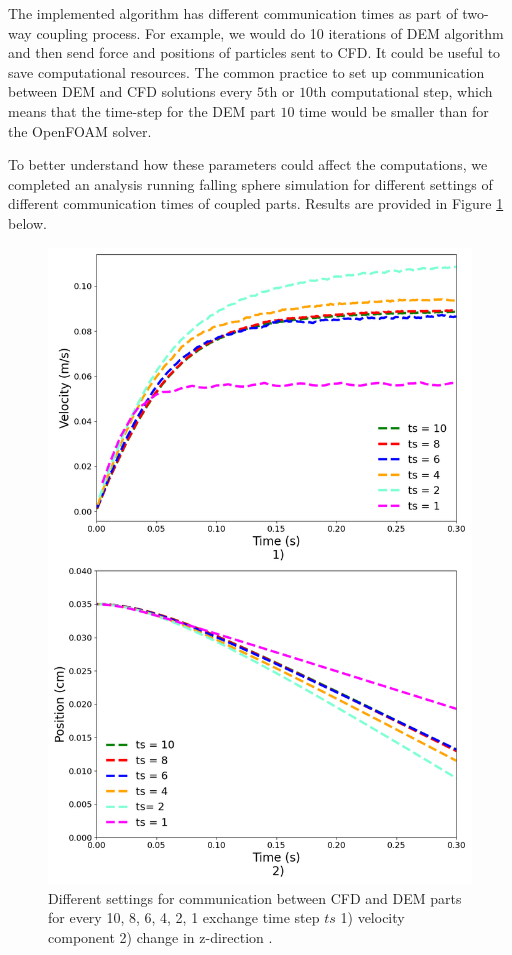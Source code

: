 The implemented algorithm has different communication times as part of two-way coupling process. For example, we would do 10 iterations of DEM algorithm and then send force and positions of particles sent to CFD. It could be useful to save computational resources. The common practice to set up communication between DEM and CFD solutions every $5$th or $10$th computational step, which means that the time-step for the DEM part $10$ time would be smaller than for the OpenFOAM solver.

To better understand how these parameters could affect the computations, we completed an analysis  running falling sphere simulation for different settings of different communication times of coupled parts. Results are provided in Figure \ref{fig:communication} below.

\begin{figure}[!h]
    \centering
    \includegraphics[width=13cm]{ GWU_Thesis_Sarmakeeva/Images/chap3/nan_simulation_192000_diff_exchange_time.png}
   \caption{Different settings for communication between CFD and DEM parts for every 10, 8, 6, 4, 2, 1 exchange time step  $ts$ 1) velocity component 2) change in z-direction .}
    \label{fig:communication}
\end{figure}


